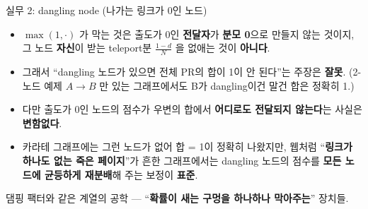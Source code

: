 \begin{frame}{실무 2: dangling node (나가는 링크가 0인 노드)}
  \begin{itemize}
    \item $\max(1, \cdot)$ 가 막는 것은 출도가 0인 \textbf{전달자}가
      \textbf{분모 0}으로 만들지 않는 것이지, 그 노드 \textbf{자신}이
      받는 teleport분 $\frac{1-d}{N}$ 을 없애는 것이 \textbf{아니다}.
    \item 그래서 ``dangling 노드가 있으면 전체 PR의 합이 1이 안
      된다''는 주장은 \textbf{잘못}. (2-노드 예제 $A \to B$ 만
      있는 그래프에서도 B가 dangling이건 말건 합은 정확히 1.)
    \item 다만 출도가 0인 노드의 점수가 우변의 합에서
      \textbf{어디로도 전달되지 않는다}는 사실은 \textbf{변함없다}.
    \item 카라테 그래프에는 그런 노드가 없어 합 = 1이 정확히 나왔지만,
      웹처럼 ``\textbf{링크가 하나도 없는 죽은 페이지}''가 흔한
      그래프에서는 dangling 노드의 점수를 \textbf{모든 노드에
      균등하게 재분배}해 주는 보정이 \textbf{표준}.
  \end{itemize}
  {\footnotesize 댐핑 팩터와 같은 계열의 공학 ---
  ``\textbf{확률이 새는 구멍을 하나하나 막아주는}'' 장치들.}
\end{frame}
